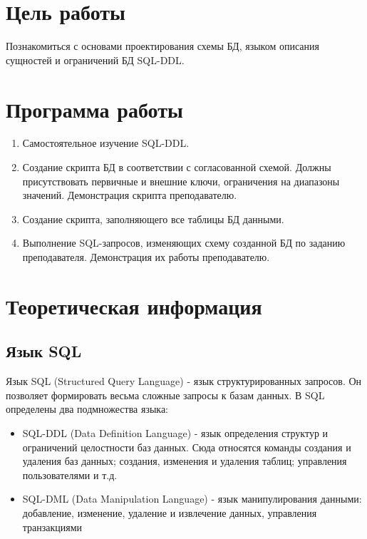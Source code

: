 
\usepackage{minted}







\section{Цель работы}
Познакомиться с основами проектирования схемы БД, языком описания сущностей и ограничений БД SQL-DDL.

\section{Программа работы}
	\begin {enumerate}
	\item Самостоятельное изучение SQL-DDL.
	\item Создание скрипта БД в соответствии с согласованной схемой. Должны присутствовать первичные и внешние ключи, ограничения на диапазоны значений. Демонстрация скрипта преподавателю. 
	\item Создание скрипта, заполняющего все таблицы БД данными.
	\item Выполнение SQL-запросов, изменяющих схему созданной БД по заданию преподавателя. Демонстрация их работы преподавателю.
	\end {enumerate}

\section{Теоретическая информация}

\subsection{Язык SQL}
Язык SQL (Structured Query Language) - язык структурированных запросов. Он позволяет формировать весьма сложные запросы к базам данных. В SQL определены два подмножества языка:
\begin {itemize}
	\item SQL-DDL (Data Definition Language) - язык определения структур и ограничений целостности баз данных. Сюда относятся команды создания и удаления баз данных; создания, изменения и удаления таблиц; управления пользователями и т.д.
	\item SQL-DML (Data Manipulation Language) - язык манипулирования данными: добавление, изменение, удаление и извлечение данных, управления транзакциями
\end {itemize}

